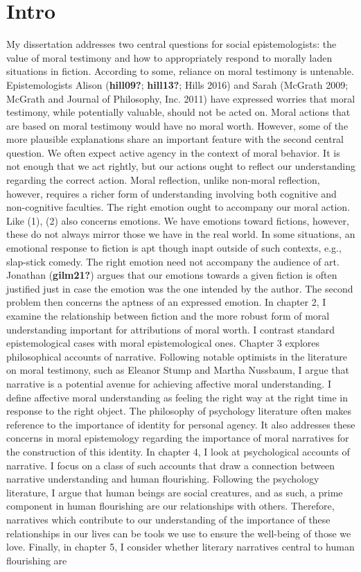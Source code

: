 \documentclass[12pt]{book}
\theoremstyle{definition}
\theoremstyle{remark}
\begin{document}
\chapter{Intro}\label{intro-1}

My dissertation addresses two central questions for social epistemologists: the value of moral testimony and how to appropriately respond to morally laden situations in fiction. According to some, reliance on moral testimony is untenable. Epistemologists Alison (\textbf{hill09?}; \textbf{hill13?}; Hills 2016) and Sarah (McGrath 2009; McGrath and Journal of Philosophy, Inc. 2011) have expressed worries that moral testimony, while potentially valuable, should not be acted on. Moral actions that are based on moral testimony would have no moral worth. However, some of the more plausible explanations share an important feature with the second central question. We often expect active agency in the context of moral behavior. It is not enough that we act rightly, but our actions ought to reflect our understanding regarding the correct action. Moral reflection, unlike non-moral reflection, however, requires a richer form of understanding involving both cognitive and non-cognitive faculties. The right emotion ought to accompany our moral action. Like (1), (2) also concerns emotions. We have emotions toward fictions, however, these do not always mirror those we have in the real world. In some situations, an emotional response to fiction is apt though inapt outside of such contexts, e.g., slap-stick comedy. The right emotion need not accompany the audience of art. Jonathan (\textbf{gilm21?}) argues that our emotions towards a given fiction is often justified just in case the emotion was the one intended by the author. The second problem then concerns the aptness of an expressed emotion. In chapter 2, I examine the relationship between fiction and the more robust form of moral understanding important for attributions of moral worth. I contrast standard epistemological cases with moral epistemological ones. Chapter 3 explores philosophical accounts of narrative. Following notable optimists in the literature on moral testimony, such as Eleanor Stump and Martha Nussbaum, I argue that narrative is a potential avenue for achieving affective moral understanding. I define affective moral understanding as feeling the right way at the right time in response to the right object. The philosophy of psychology literature often makes reference to the importance of identity for personal agency. It also addresses these concerns in moral epistemology regarding the importance of moral narratives for the construction of this identity. In chapter 4, I look at psychological accounts of narrative. I focus on a class of such accounts that draw a connection between narrative understanding and human flourishing. Following the psychology literature, I argue that human beings are social creatures, and as such, a prime component in human flourishing are our relationships with others. Therefore, narratives which contribute to our understanding of the importance of these relationships in our lives can be tools we use to ensure the well-being of those we love. Finally, in chapter 5, I consider whether literary narratives central to human flourishing are 
\end{document}
